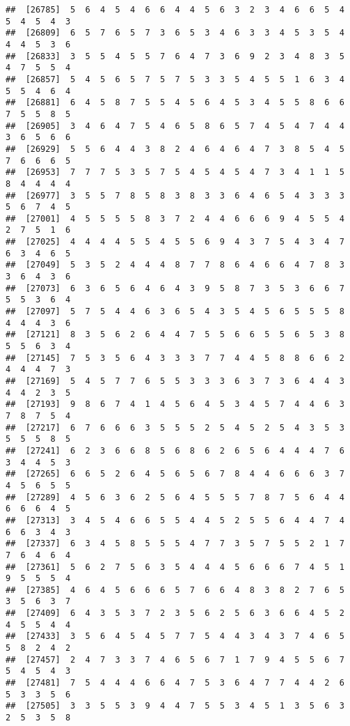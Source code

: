 \documentclass[
]{book}
\begin{document}
\begin{verbatim}
##  [26785]  5  6  4  5  4  6  6  4  4  5  6  3  2  3  4  6  6  5  4  5  4  5  4  3
##  [26809]  6  5  7  6  5  7  3  6  5  3  4  6  3  3  4  5  3  5  4  4  4  5  3  6
##  [26833]  3  5  5  4  5  5  7  6  4  7  3  6  9  2  3  4  8  3  5  4  7  5  5  4
##  [26857]  5  4  5  6  5  7  5  7  5  3  3  5  4  5  5  1  6  3  4  5  5  4  6  4
##  [26881]  6  4  5  8  7  5  5  4  5  6  4  5  3  4  5  5  8  6  6  7  5  5  8  5
##  [26905]  3  4  6  4  7  5  4  6  5  8  6  5  7  4  5  4  7  4  4  3  6  5  6  6
##  [26929]  5  5  6  4  4  3  8  2  4  6  4  6  4  7  3  8  5  4  5  7  6  6  6  5
##  [26953]  7  7  7  5  3  5  7  5  4  5  4  5  4  7  3  4  1  1  5  8  4  4  4  4
##  [26977]  3  5  5  7  8  5  8  3  8  3  3  6  4  6  5  4  3  3  3  5  6  7  4  5
##  [27001]  4  5  5  5  5  8  3  7  2  4  4  6  6  6  9  4  5  5  4  2  7  5  1  6
##  [27025]  4  4  4  4  5  5  4  5  5  6  9  4  3  7  5  4  3  4  7  6  3  4  6  5
##  [27049]  5  3  5  2  4  4  4  8  7  7  8  6  4  6  6  4  7  8  3  3  6  4  3  6
##  [27073]  6  3  6  5  6  4  6  4  3  9  5  8  7  3  5  3  6  6  7  5  5  3  6  4
##  [27097]  5  7  5  4  4  6  3  6  5  4  3  5  4  5  6  5  5  5  8  4  4  4  3  6
##  [27121]  8  3  5  6  2  6  4  4  7  5  5  6  6  5  5  6  5  3  8  5  5  6  3  4
##  [27145]  7  5  3  5  6  4  3  3  3  7  7  4  4  5  8  8  6  6  2  4  4  4  7  3
##  [27169]  5  4  5  7  7  6  5  5  3  3  3  6  3  7  3  6  4  4  3  4  4  2  3  5
##  [27193]  9  8  6  7  4  1  4  5  6  4  5  3  4  5  7  4  4  6  3  7  8  7  5  4
##  [27217]  6  7  6  6  6  3  5  5  5  2  5  4  5  2  5  4  3  5  3  5  5  5  8  5
##  [27241]  6  2  3  6  6  8  5  6  8  6  2  6  5  6  4  4  4  7  6  3  4  4  5  3
##  [27265]  6  6  5  2  6  4  5  6  5  6  7  8  4  4  6  6  6  3  7  4  5  6  5  5
##  [27289]  4  5  6  3  6  2  5  6  4  5  5  5  7  8  7  5  6  4  4  6  6  6  4  5
##  [27313]  3  4  5  4  6  6  5  5  4  4  5  2  5  5  6  4  4  7  4  6  6  3  4  3
##  [27337]  6  3  4  5  8  5  5  5  4  7  7  3  5  7  5  5  2  1  7  7  6  4  6  4
##  [27361]  5  6  2  7  5  6  3  5  4  4  4  5  6  6  6  7  4  5  1  9  5  5  5  4
##  [27385]  4  6  4  5  6  6  6  5  7  6  6  4  8  3  8  2  7  6  5  3  5  6  3  7
##  [27409]  6  4  3  5  3  7  2  3  5  6  2  5  6  3  6  6  4  5  2  4  5  5  4  4
##  [27433]  3  5  6  4  5  4  5  7  7  5  4  4  3  4  3  7  4  6  5  5  8  2  4  2
##  [27457]  2  4  7  3  3  7  4  6  5  6  7  1  7  9  4  5  5  6  7  5  4  5  4  3
##  [27481]  7  5  4  4  4  6  6  4  7  5  3  6  4  7  7  4  4  2  6  5  3  3  5  6
##  [27505]  3  3  5  5  3  9  4  4  7  5  5  3  4  5  1  3  5  6  3  2  5  3  5  8

\end{verbatim}
\end{document}

